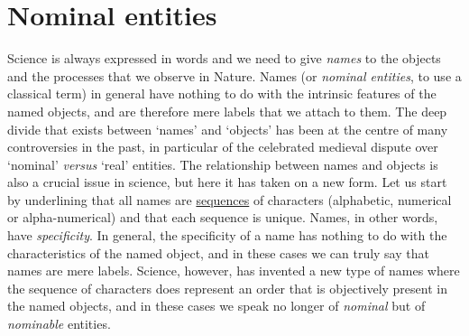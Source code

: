\documentclass[12pt]{article}
\begin{document}
\hypertarget{nominal_entities}{}
\section{Nominal entities}
Science is always expressed in words and we need to give \textit{names} to the objects and the processes that we observe in Nature. Names (or \textit{nominal entities}, to use a classical term) in general have nothing to do with the intrinsic features of the named objects, and are therefore mere labels that we attach to them. The deep divide that exists between `names' and `objects' has been at the centre of many controversies in the past, in particular of the celebrated medieval dispute over `nominal' \textit{versus} `real' entities. The relationship between names and objects is also a crucial issue in science, but here it has taken on a new form. Let us start by underlining that all names are \hyperlink{sequences}{sequences} of characters (alphabetic, numerical or alpha-numerical) and that each sequence is unique. Names, in other words, have \textit{specificity}. In general, the specificity of a name has nothing to do with the characteristics of the named object, and in these cases we can truly say that names are mere labels. Science, however, has invented a new type of names where the sequence of characters does represent an order that is objectively present in the named objects, and in these cases we speak no longer of \textit{nominal} but of \textit{nominable} entities. 

\hypertarget{nominable_entity}{}
\end{document}
